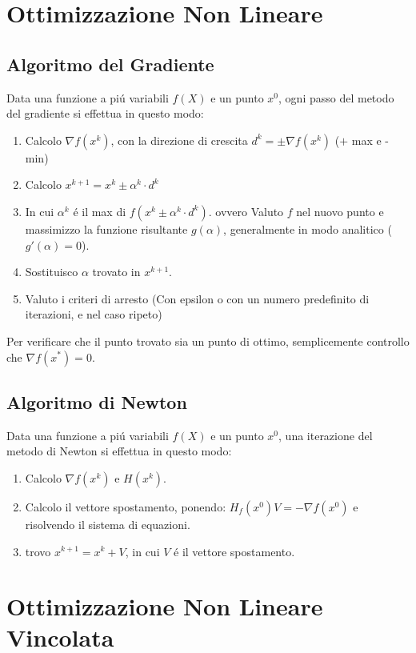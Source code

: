 \documentclass[12pt, a4paper, openany]{book}
\begin{document}
\chapter{Ottimizzazione Non Lineare}
\section{Algoritmo del Gradiente}
Data una funzione a piú variabili $f(X)$ e un punto $x^0$, ogni passo del metodo del gradiente si effettua in questo modo:
\begin{enumerate}
	\item Calcolo $\nabla f(x^k)$, con la direzione di crescita $d^k=\pm \nabla f(x^k)$ ($+$ max e - min)
	\item Calcolo $x^{k+1} = x^k \pm \alpha^k \cdot d^k$
	\item In cui $\alpha^k$ é il max di $f(x^k \pm \alpha^k \cdot d^k)$. ovvero
	      Valuto $f$ nel nuovo punto e massimizzo la funzione risultante $g(\alpha)$, generalmente in modo analitico ($g'(\alpha)=0$).
	\item Sostituisco $\alpha$ trovato in $x^{k+1}$.
	\item Valuto i criteri di arresto (Con epsilon o con un numero predefinito di iterazioni, e nel caso ripeto)
\end{enumerate}
Per verificare che il punto trovato sia un punto di ottimo, semplicemente controllo che $\nabla f(x^*) = 0$.
\pagebreak

\section{Algoritmo di Newton}
Data una funzione a piú variabili $f(X)$ e un punto $x^0$, una iterazione del metodo di Newton si effettua in questo modo:
\begin{enumerate}
	\item Calcolo $\nabla f(x^k)$ e $H(x^k)$.
	\item Calcolo il vettore spostamento, ponendo: $H_f(x^0) V = - \nabla f(x^0)$ e risolvendo il sistema di equazioni.
	\item trovo $x^{k+1} = x^k + V$, in cui $V$ é il vettore spostamento.
\end{enumerate}


\chapter{Ottimizzazione Non Lineare Vincolata}
\end{document}
